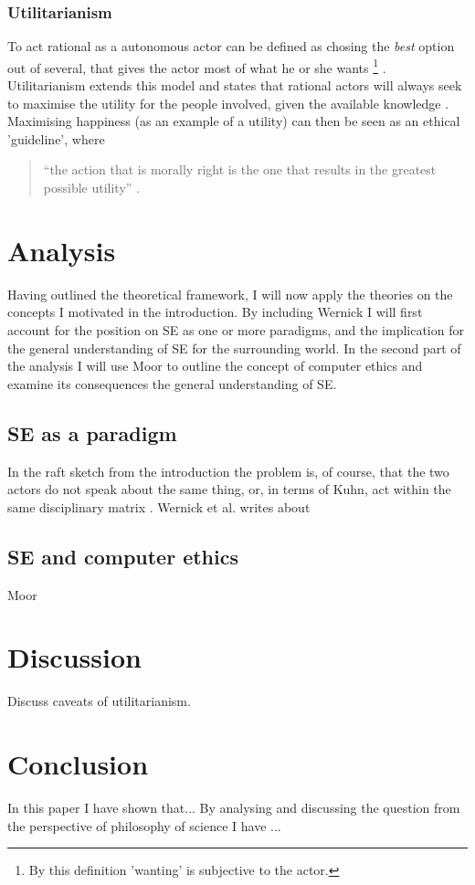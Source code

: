 \documentclass{article}
\begin{document}
\subsubsection{Utilitarianism}
To act rational as a autonomous actor can be defined as chosing the \textit{best} option out of several, that gives the actor most of what he or she wants \footnote{By this definition 'wanting' is subjective to the actor.} \citep[p. 232]{Gilje:2007}. Utilitarianism extends this model and states that rational actors will always seek to maximise the utility for the people involved, given the available knowledge \citep[p. 232]{Holm:2014, Gilje:2007}. Maximising happiness (as an example of a utility) can then be seen as an ethical 'guideline', where
\begin{quote}
``the action that is morally right is the one that results in the greatest possible utility'' \citep[p. 207]{Holm:2014}.
\end{quote}


\section{Analysis}
Having outlined the theoretical framework, I will now apply the theories on the concepts I motivated in the introduction. By including Wernick I will first account for the position on SE as one or more paradigms, and the implication for the general understanding of SE for the surrounding world.
In the second part of the analysis I will use Moor to outline the concept of computer ethics and examine its consequences the general understanding of SE.

\subsection{SE as a paradigm}
In the raft sketch from the introduction the problem is, of course, that the two actors do not speak about the same thing, or, in terms of Kuhn, act within the same disciplinary matrix \citep{Holm:2014}. Wernick et al. writes about 

\subsection{SE and computer ethics}
Moor 

\section{Discussion} \label{Discussion}
Discuss caveats of utilitarianism.

\section{Conclusion}
In this paper I have shown that...
By analysing and discussing the question from the perspective
of philosophy of science I have ...


\end{document}
